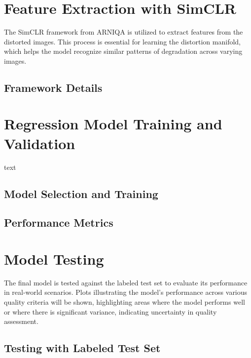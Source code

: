 \section{Feature Extraction with SimCLR}
\label{sec:SimCLR}
The SimCLR framework from ARNIQA is utilized to extract features from the distorted images. This process is essential for learning the distortion manifold, which helps the model recognize similar patterns of degradation across varying images. \par
\vspace{\baselineskip}
\noindent

\subsection{Framework Details}
\label{sub:FrameworkSimCLR}


\section{Regression Model Training and Validation}
\label{sec:Regression}
text \par
\vspace{\baselineskip}
\noindent

\subsection{Model Selection and Training}
\label{sub:ModelTraining}

\subsection{Performance Metrics}
\label{sub:PerformanceMetrics}


\section{Model Testing}
\label{sec:Test}
The final model is tested against the labeled test set to evaluate its performance in real-world scenarios. Plots illustrating the model’s performance across various quality criteria will be shown, highlighting areas where the model performs well or where there is significant variance, indicating uncertainty in quality assessment. \par
\vspace{\baselineskip}
\noindent

\subsection{Testing with Labeled Test Set}
\label{sub:ModelTraining}